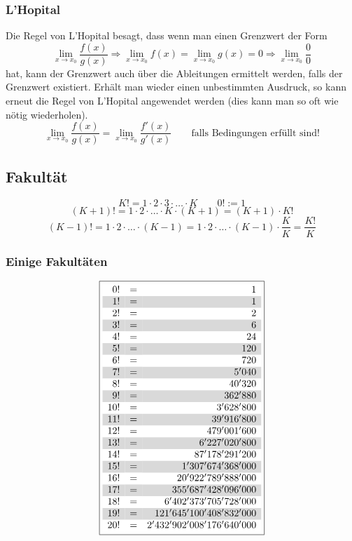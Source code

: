 \subsubsection{L'Hopital}
Die Regel von L'Hopital besagt, dass wenn man einen Grenzwert der Form 
\[ \lim\limits_{x \rightarrow x_0} \frac{f(x)}{g(x)} \Rightarrow \lim\limits_{x \rightarrow x_0} f(x) = \lim\limits_{x \rightarrow x_0} g(x) = 0 \Rightarrow \lim\limits_{x \rightarrow x_0} \frac{0}{0} \] hat, kann der Grenzwert auch über die Ableitungen ermittelt werden, falls der Grenzwert existiert.
Erhält man wieder einen unbestimmten Ausdruck, so kann erneut die Regel von L'Hopital angewendet werden (dies kann man so oft wie nötig wiederholen).
\[ \boxed{ \lim\limits_{x \rightarrow x_0} \frac{f(x)}{g(x)} = \lim\limits_{x \rightarrow x_0} \frac{f'(x)}{g'(x)} \quad} \quad \text{falls Bedingungen erfüllt sind!}\]

\subsection{Fakultät}
\[ \boxed{K! = 1 \cdot 2 \cdot 3\cdot \ldots \cdot K} \qquad \boxed{0! := 1} \]
\[ \boxed{(K + 1)! = 1  \cdot 2 \cdot \ldots \cdot K \cdot (K + 1) = (K + 1) \cdot K!} \]
\[ \boxed{(K - 1)! = 1  \cdot 2 \cdot \ldots \cdot (K - 1) = 1  \cdot 2 \cdot \ldots \cdot (K - 1) \cdot \frac{K}{K} = \frac{K!}{K}} \]
\subsubsection{Einige Fakultäten}
\[ \boxed{\begin{array}{rcr}
\rowcolor{white}  0!&=&1\\
\rowcolor{lgray}  1!&=&1\\
\rowcolor{white}  2!&=&2\\
\rowcolor{lgray}  3!&=&6\\
\rowcolor{white}  4!&=&24\\
\rowcolor{lgray}  5!&=&120\\
\rowcolor{white}  6!&=&720\\
\rowcolor{lgray}  7!&=&5'040\\
\rowcolor{white}  8!&=&40'320\\
\rowcolor{lgray}  9!&=&362'880\\
\rowcolor{white} 10!&=&3'628'800\\
\rowcolor{lgray} 11!&=&39'916'800\\
\rowcolor{white} 12!&=&479'001'600\\
\rowcolor{lgray} 13!&=&6'227'020'800\\
\rowcolor{white} 14!&=&87'178'291'200\\
\rowcolor{lgray} 15!&=&1'307'674'368'000\\
\rowcolor{white} 16!&=&20'922'789'888'000\\
\rowcolor{lgray} 17!&=&355'687'428'096'000\\
\rowcolor{white} 18!&=&6'402'373'705'728'000\\
\rowcolor{lgray} 19!&=&121'645'100'408'832'000\\
\rowcolor{white} 20!&=&2'432'902'008'176'640'000\\
\end{array}}\]
